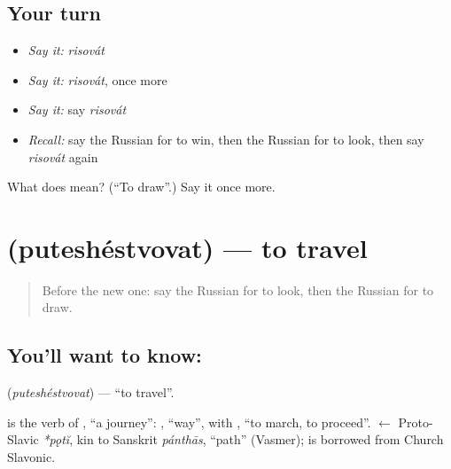 \subsection*{Your turn}
\begin{itemize}
\raggedright
  \item \emph{Say it:} \emph{risovát}
  \item \emph{Say it:} \emph{risovát}, once more
  \item \emph{Say it:} say \emph{risovát}
  \item \emph{Recall:} say the Russian for to win, then the Russian for to look, then say \emph{risovát} again
\end{itemize}

\begin{tcolorbox}[breakable,colback=teal!4,colframe=teal!35!black,title={Before you move on}]
What does  mean? (\textquotedblleft{}To draw\textquotedblright{}.) Say it once more.
\end{tcolorbox}
\section[\texorpdfstring{\ru{путешествовать} (puteshéstvovat)}{путешествовать (puteshéstvovat)}]{ (puteshéstvovat) — to travel}

\label{lesson:RU-C135-to-travel}



\begin{quote}
Before the new one: say the Russian for to look, then the Russian for to draw.
\end{quote}

\subsection*{You'll want to know: }
\textbf{} (\emph{puteshéstvovat}) — \textquotedblleft{}to travel\textquotedblright{}.

\begin{cousinweb}
\textbf{} is the verb of \emph{}, \textquotedblleft{}a journey\textquotedblright{}: \emph{}, \textquotedblleft{}way\textquotedblright{}, with \emph{}, \textquotedblleft{}to march, to proceed\textquotedblright{}. \emph{} $\leftarrow$ Proto-Slavic \emph{*pǫtĭ}, kin to Sanskrit \emph{pánthās}, \textquotedblleft{}path\textquotedblright{} (Vasmer); \emph{} is borrowed from Church Slavonic.
\end{cousinweb}

